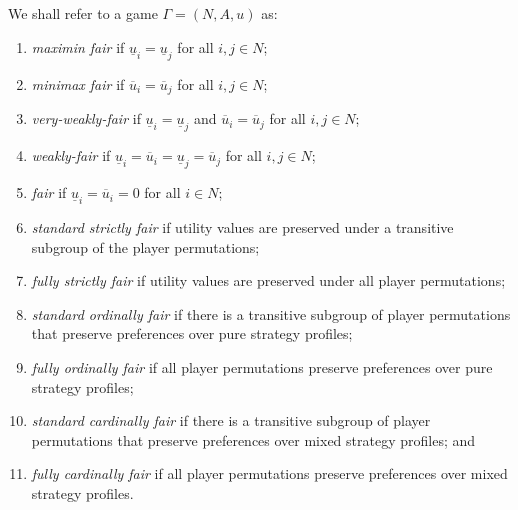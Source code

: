 \begin{definition}
	We shall refer to a game $\Gamma = (N, A, u)$ as:
	\begin{enumerate}
		\item \textit{maximin fair} if $\underline{u}_i = \underline{u}_j$ for all $i, j \in N$;
		\item \textit{minimax fair} if $\overline{u}_i = \overline{u}_j$ for all $i, j \in N$;
		\item \textit{very-weakly-fair} if $\underline{u}_i = \underline{u}_j$ and $\overline{u}_i = \overline{u}_j$ for all $i, j \in N$;
		\item \textit{weakly-fair} if $\underline{u}_i = \overline{u}_i = \underline{u}_j = \overline{u}_j$ for all $i, j \in N$; 
		\item \textit{fair} if $\underline{u}_i = \overline{u}_i = 0$ for all $i \in N$;
		\item \textit{standard strictly fair} if utility values are preserved under a transitive subgroup of the player permutations;
		\item \textit{fully strictly fair} if utility values are preserved under all player permutations;
		\item \textit{standard ordinally fair} if there is a transitive subgroup of player permutations that preserve preferences over pure strategy profiles;
		\item \textit{fully ordinally fair} if all player permutations preserve preferences over pure strategy profiles;
		\item \textit{standard cardinally fair} if there is a transitive subgroup of player permutations that preserve preferences over mixed strategy profiles; and
		\item \textit{fully cardinally fair} if all player permutations preserve preferences over mixed strategy profiles.
	\end{enumerate}
\end{definition}

